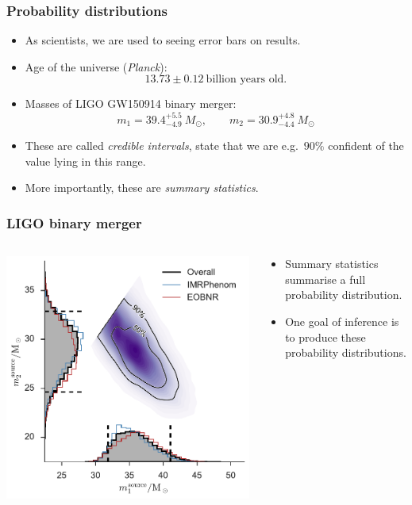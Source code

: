 \documentclass[%
]{beamer}
\begin{document}
\begin{frame}
    \frametitle{Probability distributions}

    \begin{itemize}
        \item As scientists, we are used to seeing error bars on results.
        \item Age of the universe ({\em Planck\/}): 
         \[13.73\pm 0.12\:\text{billion years old.}\]
        \item Masses of LIGO GW150914 binary merger: 
        \[m_1 = 39.4^{+5.5}_{-4.9}\:M_\odot,\qquad m_2 = 30.9^{+4.8}_{-4.4}\:M_\odot \]
        \item These are called {\em credible intervals}, state that we are e.g.\ $90\%$ confident of the value lying in this range.
        \item More importantly, these are {\em summary statistics}.
    \end{itemize}
\end{frame}

\begin{frame}
    \frametitle{LIGO binary merger}
    \begin{columns}
        \begin{column}{0.65\textwidth}
            \includegraphics[width=\textwidth]{./figures/ligo_m1_m2.pdf}
        \end{column}
        \begin{column}{0.35\textwidth}
            \begin{itemize}
                \item Summary statistics summarise a full probability distribution.
                \item One goal of inference is to produce these probability distributions.
            \end{itemize}
        \end{column}
    \end{columns}
\end{frame}
\end{document}
